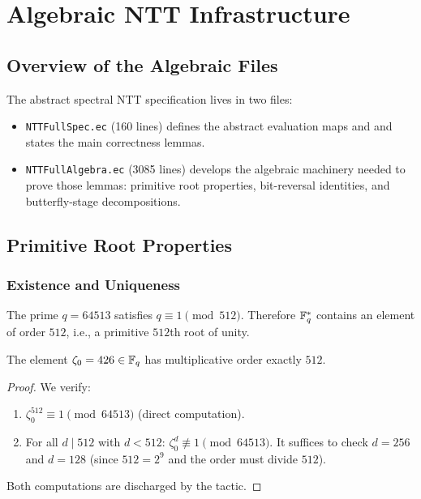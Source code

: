 
\chapter{Algebraic NTT Infrastructure}
\label{ch:algebra}

\section{Overview of the Algebraic Files}

The abstract spectral NTT specification lives in two files:
\begin{itemize}
  \item \texttt{NTTFullSpec.ec} (160 lines) defines the abstract evaluation
        maps  and  and states the main
        correctness lemmas.
  \item \texttt{NTTFullAlgebra.ec} (3085 lines) develops the algebraic
        machinery needed to prove those lemmas: primitive root properties,
        bit-reversal identities, and butterfly-stage decompositions.
\end{itemize}

\section{Primitive Root Properties}

\subsection{Existence and Uniqueness}

The prime $q = 64513$ satisfies $q \equiv 1 \pmod{512}$.  Therefore $\mathbb{F}_q^*$
contains an element of order $512$, i.e., a primitive $512$th root of unity.

\begin{theorem}
  The element $\zeta_0 = 426 \in \mathbb{F}_q$ has multiplicative order exactly $512$.
\label{thm:zeta_order}
\end{theorem}

\begin{proof}
  We verify:
  \begin{enumerate}
    \item $\zeta_0^{512} \equiv 1 \pmod{64513}$ (direct computation).
    \item For all $d \mid 512$ with $d < 512$:
          $\zeta_0^d \not\equiv 1 \pmod{64513}$.
          It suffices to check $d = 256$ and $d = 128$ (since $512 = 2^9$
          and the order must divide $512$).
  \end{enumerate}
  Both computations are discharged by the  tactic.
\end{proof}

